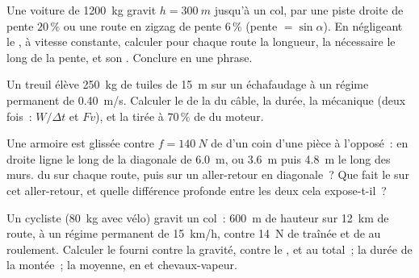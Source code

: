 \begin{exercise}[$\star\star\star$]\label{exo:g11:work-of-force:12}
Une voiture de \qty{1200}{kg} gravit $h = \qty{300}{m}$ jusqu'à un col,
par une piste droite de pente $20\,\%$ ou une route en zigzag de pente
$6\,\%$ (pente $= \sin\alpha$). En négligeant le
, à vitesse constante, calculer
pour chaque route la longueur, la
 nécessaire le long de la pente, et
son . Conclure en une phrase.
\end{exercise}

\begin{exercise}[$\star\star\star$]\label{exo:g11:work-of-force:13}
Un treuil élève \qty{250}{kg} de tuiles de \qty{15}{m} sur un échafaudage
à un régime permanent de \qty{0.40}{m/s}. Calculer le
 de la
 du câble, la durée, la
 mécanique (deux fois~:
$W/\Delta t$ et $Fv$), et la
 tirée à
$70\,\%$ de  du
moteur.
\end{exercise}

\begin{exercise}[$\star\star\star$]\label{exo:g11:work-of-force:14}
Une armoire est glissée contre $f = \qty{140}{N}$ de
 d'un coin d'une pièce à
l'opposé~: en droite ligne le long de la diagonale de \qty{6.0}{m}, ou
\qty{3.6}{m} puis \qty{4.8}{m} le long des murs.
 du
 sur chaque route, puis sur
un aller-retour en diagonale~? Que fait le
 sur cet aller-retour, et
quelle différence profonde entre les deux
 cela expose-t-il~?
\end{exercise}

\begin{exercise}[$\star\star\star$]\label{exo:g11:work-of-force:15}
Un cycliste (\qty{80}{kg} avec vélo) gravit un col~: \qty{600}{m} de
hauteur sur \qty{12}{km} de route, à un régime permanent de
\qty{15}{km/h}, contre \qty{14}{N} de traînée et de
 au roulement. Calculer le
 fourni contre la gravité, contre le
, et au total~; la durée de la
montée~; la  moyenne, en
 et
chevaux-vapeur.
\end{exercise}

